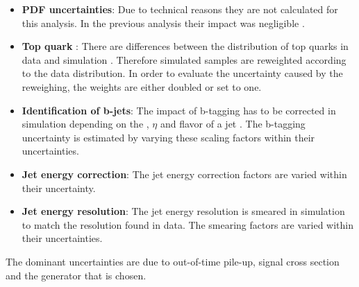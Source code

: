 \begin{itemize}
\item \textbf{PDF uncertainties}: Due to technical reasons they are not calculated for this analysis. In the previous analysis their impact was negligible \cite{CMS-PAS-TOP-13-011}.
\item \textbf{Top quark \pt}: There are differences between the \pt distribution of top quarks in data and simulation \cite{CMS-PAS-TOP-12-027}. Therefore simulated samples are reweighted according to the data distribution. In order to evaluate the uncertainty caused by the reweighing, the weights are either doubled or set to one.
\item \textbf{Identification of b-jets}: The impact of b-tagging has to be corrected in simulation depending on the \pt , $\eta$ and flavor of a jet \cite{CMS-PAS-BTV-13-001}. The b-tagging uncertainty is estimated by varying these scaling factors within their uncertainties.
\item \textbf{Jet energy correction}: The jet energy correction factors are varied within their uncertainty.
\item \textbf{Jet energy resolution}: The jet energy resolution is smeared in simulation to match the resolution found in data. The smearing factors are varied within their uncertainties.
\end{itemize}

The dominant uncertainties are due to out-of-time pile-up, signal cross section and the generator that is chosen.

